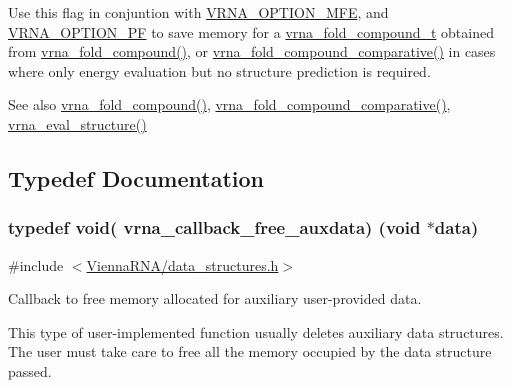 Use this flag in conjuntion with \hyperlink{group__fold__compound_gae63be9127fe7dcc1f9bb14f5bb1064ee}{V\+R\+N\+A\+\_\+\+O\+P\+T\+I\+O\+N\+\_\+\+M\+FE}, and \hyperlink{group__fold__compound_gabfbadcddda3e74ce7f49035ef8f058f7}{V\+R\+N\+A\+\_\+\+O\+P\+T\+I\+O\+N\+\_\+\+PF} to save memory for a \hyperlink{group__fold__compound_ga1b0cef17fd40466cef5968eaeeff6166}{vrna\+\_\+fold\+\_\+compound\+\_\+t} obtained from \hyperlink{group__fold__compound_ga6601d994ba32b11511b36f68b08403be}{vrna\+\_\+fold\+\_\+compound()}, or \hyperlink{group__fold__compound_gad6bacc816af274922b13d947f708aa0c}{vrna\+\_\+fold\+\_\+compound\+\_\+comparative()} in cases where only energy evaluation but no structure prediction is required.

\begin{DoxySeeAlso}{See also}
\hyperlink{group__fold__compound_ga6601d994ba32b11511b36f68b08403be}{vrna\+\_\+fold\+\_\+compound()}, \hyperlink{group__fold__compound_gad6bacc816af274922b13d947f708aa0c}{vrna\+\_\+fold\+\_\+compound\+\_\+comparative()}, \hyperlink{eval_8h_a58f199f1438d794a265f3b27fc8ea631}{vrna\+\_\+eval\+\_\+structure()} 
\end{DoxySeeAlso}


\subsection{Typedef Documentation}
\subsubsection[{\texorpdfstring{vrna\+\_\+callback\+\_\+free\+\_\+auxdata}{vrna_callback_free_auxdata}}]{\setlength{\rightskip}{0pt plus 5cm}typedef void( vrna\+\_\+callback\+\_\+free\+\_\+auxdata) (void $\ast$data)}\hypertarget{group__fold__compound_ga3ae51bfd5fc3236652d1de4e3274b49b}{}\label{group__fold__compound_ga3ae51bfd5fc3236652d1de4e3274b49b}


{\ttfamily \#include $<$\hyperlink{data__structures_8h}{Vienna\+R\+N\+A/data\+\_\+structures.\+h}$>$}



Callback to free memory allocated for auxiliary user-\/provided data. 

This type of user-\/implemented function usually deletes auxiliary data structures. The user must take care to free all the memory occupied by the data structure passed.


